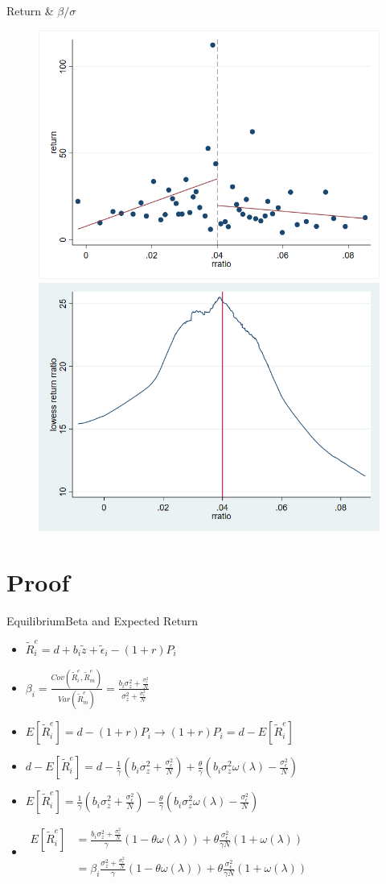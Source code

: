\documentclass{beamer}
\begin{document}
\begin{frame}{Return \& $ \beta/\sigma $}
\begin{figure}
\centering
\includegraphics[width=0.45\linewidth]{mygraph3}
\includegraphics[width=0.45\linewidth]{mygraph4}

\label{fig:mygraph4}
\end{figure}
\end{frame}



\section{Proof}
\begin{frame}{Equilibrium}{Beta and Expected Return}
\label{Proof}
\begin{itemize}
\item $\tilde{R}_i^e = d + b_i\tilde{z} + \tilde{\epsilon}_i - (1+r)P_i$
\item $ \beta_i = \frac{Cov(\tilde{R}_i^e ,\tilde{R}_m^e )}{Var(\tilde{R}_m^e)} = \frac{b_i\sigma^2_z+\frac{\sigma^2_{\epsilon}}{N}}{\sigma^2_z+\frac{\sigma^2_{\epsilon}}{N}} $
\item $ E[\tilde{R}_i^e] = d - (1+r)P_i  \rightarrow(1+r)P_i = d - E[\tilde{R}_i^e] $
\item $ d - E[\tilde{R}_i^e]  = d - \frac{1}{\gamma}(b_i\sigma^2_z+\frac{\sigma^2_{\epsilon}}{N}) + {\frac{\theta}{\gamma}(b_i\sigma^2_z\omega(\lambda)-\frac{\sigma^2_{\epsilon}}{N})} $
\item $  E[\tilde{R}_i^e] = \frac{1}{\gamma}(b_i\sigma^2_z+\frac{\sigma^2_{\epsilon}}{N}) - {\frac{\theta}{\gamma}(b_i\sigma^2_z\omega(\lambda)-\frac{\sigma^2_{\epsilon}}{N})} $
\item $  \begin{array}{ll}
E[\tilde{R}_i^e]& =    \frac{b_i\sigma^2_z+\frac{\sigma^2_{\epsilon}}{N}}{\gamma} (1-\theta\omega(\lambda)) + \theta  \frac{\sigma^2_{\epsilon}}{\gamma N}(1+\omega(\lambda)) ‌\\ 
& =\beta_i\frac{\sigma^2_z+\frac{\sigma^2_{\epsilon}}{N}}{\gamma}(1-\theta\omega(\lambda)) + \theta  \frac{\sigma^2_{\epsilon}}{\gamma N}(1+\omega(\lambda))
\end{array} $
\end{itemize}
\end{frame}
\end{document}
